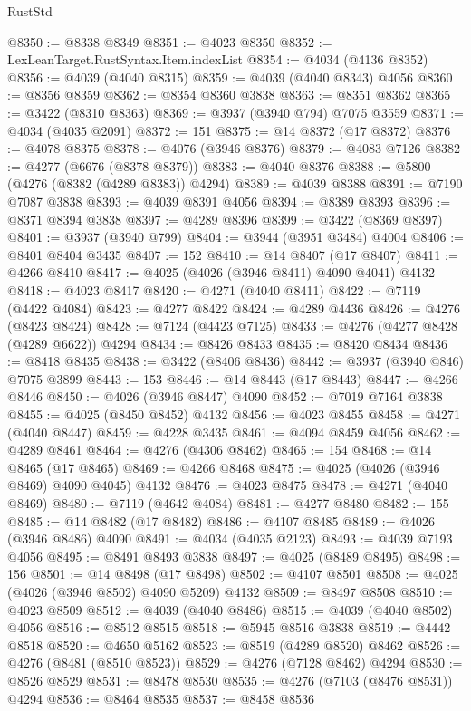 \begin{lexlean}{RustStd}
\begin{coremodule}
@8350 := @8338 @8349
@8351 := @4023 @8350
@8352 := LexLeanTarget.RustSyntax.Item.indexList
@8354 := @4034 (@4136 @8352)
@8356 := @4039 (@4040 @8315)
@8359 := @4039 (@4040 @8343) @4056
@8360 := @8356 @8359
@8362 := @8354 @8360 @3838
@8363 := @8351 @8362
@8365 := @3422 (@8310 @8363)
@8369 := @3937 (@3940 @794) @7075 @3559
@8371 := @4034 (@4035 @2091)
@8372 := 151
@8375 := @14 @8372 (@17 @8372)
@8376 := @4078 @8375
@8378 := @4076 (@3946 @8376)
@8379 := @4083 @7126
@8382 := @4277 (@6676 (@8378 @8379))
@8383 := @4040 @8376
@8388 := @5800 (@4276 (@8382 (@4289 @8383)) @4294)
@8389 := @4039 @8388
@8391 := @7190 @7087 @3838
@8393 := @4039 @8391 @4056
@8394 := @8389 @8393
@8396 := @8371 @8394 @3838
@8397 := @4289 @8396
@8399 := @3422 (@8369 @8397)
@8401 := @3937 (@3940 @799)
@8404 := @3944 (@3951 @3484) @4004
@8406 := @8401 @8404 @3435
@8407 := 152
@8410 := @14 @8407 (@17 @8407)
@8411 := @4266 @8410
@8417 := @4025 (@4026 (@3946 @8411) @4090 @4041) @4132
@8418 := @4023 @8417
@8420 := @4271 (@4040 @8411)
@8422 := @7119 (@4422 @4084)
@8423 := @4277 @8422
@8424 := @4289 @4436
@8426 := @4276 (@8423 @8424)
@8428 := @7124 (@4423 @7125)
@8433 := @4276 (@4277 @8428 (@4289 @6622)) @4294
@8434 := @8426 @8433
@8435 := @8420 @8434
@8436 := @8418 @8435
@8438 := @3422 (@8406 @8436)
@8442 := @3937 (@3940 @846) @7075 @3899
@8443 := 153
@8446 := @14 @8443 (@17 @8443)
@8447 := @4266 @8446
@8450 := @4026 (@3946 @8447) @4090
@8452 := @7019 @7164 @3838
@8455 := @4025 (@8450 @8452) @4132
@8456 := @4023 @8455
@8458 := @4271 (@4040 @8447)
@8459 := @4228 @3435
@8461 := @4094 @8459 @4056
@8462 := @4289 @8461
@8464 := @4276 (@4306 @8462)
@8465 := 154
@8468 := @14 @8465 (@17 @8465)
@8469 := @4266 @8468
@8475 := @4025 (@4026 (@3946 @8469) @4090 @4045) @4132
@8476 := @4023 @8475
@8478 := @4271 (@4040 @8469)
@8480 := @7119 (@4642 @4084)
@8481 := @4277 @8480
@8482 := 155
@8485 := @14 @8482 (@17 @8482)
@8486 := @4107 @8485
@8489 := @4026 (@3946 @8486) @4090
@8491 := @4034 (@4035 @2123)
@8493 := @4039 @7193 @4056
@8495 := @8491 @8493 @3838
@8497 := @4025 (@8489 @8495)
@8498 := 156
@8501 := @14 @8498 (@17 @8498)
@8502 := @4107 @8501
@8508 := @4025 (@4026 (@3946 @8502) @4090 @5209) @4132
@8509 := @8497 @8508
@8510 := @4023 @8509
@8512 := @4039 (@4040 @8486)
@8515 := @4039 (@4040 @8502) @4056
@8516 := @8512 @8515
@8518 := @5945 @8516 @3838
@8519 := @4442 @8518
@8520 := @4650 @5162
@8523 := @8519 (@4289 @8520) @8462
@8526 := @4276 (@8481 (@8510 @8523))
@8529 := @4276 (@7128 @8462) @4294
@8530 := @8526 @8529
@8531 := @8478 @8530
@8535 := @4276 (@7103 (@8476 @8531)) @4294
@8536 := @8464 @8535
@8537 := @8458 @8536

\end{coremodule}
\end{lexlean}
